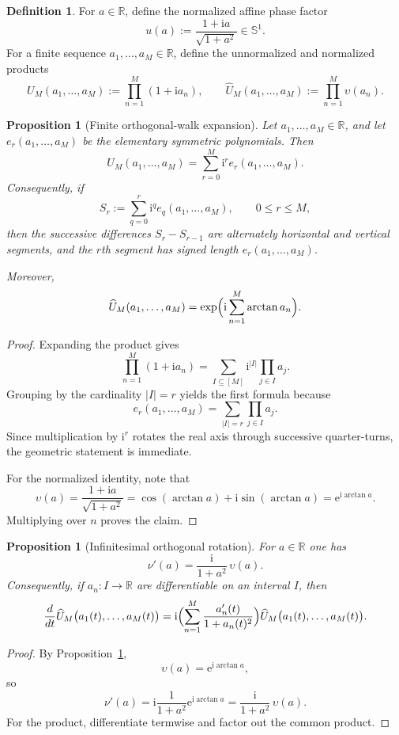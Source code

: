 \documentclass[11pt,a4paper]{article}
\numberwithin{equation}{section}
\newtheorem{proposition}[theorem]{Proposition}
\theoremstyle{definition}
\newtheorem{definition}[theorem]{Definition}
\theoremstyle{remark}
\newcommand{\RR}{\mathbb R}
\newcommand{\Sph}{\mathbb S^1}
\newcommand{\e}{\mathrm e}
\newcommand{\ii}{\mathrm i}
\begin{document}
\begin{definition}
For $a\in\RR$, define the normalized affine phase factor
\[
u(a):=\frac{1+\ii a}{\sqrt{1+a^2}}\in\Sph.
\]
For a finite sequence $a_1,\dots,a_M\in\RR$, define the unnormalized and normalized products
\[
U_M(a_1,\dots,a_M):=\prod_{n=1}^M (1+\ii a_n),
\qquad
\widehat U_M(a_1,\dots,a_M):=\prod_{n=1}^M \upsilon(a_n).
\]
\end{definition}

\begin{proposition}[Finite orthogonal-walk expansion]\label{P4:prop:finite-orthogonal}
Let $a_1,\dots,a_M\in\RR$, and let $e_r(a_1,\dots,a_M)$ be the elementary symmetric polynomials.  Then
\[
U_M(a_1,\dots,a_M)=\sum_{r=0}^M \ii^r e_r(a_1,\dots,a_M).
\]
Consequently, if
\[
S_r:=\sum_{q=0}^r \ii^q e_q(a_1,\dots,a_M),
\qquad 0\le r\le M,
\]
then the successive differences $S_r-S_{r-1}$ are alternately horizontal and vertical segments, and the $r$th segment has signed length $e_r(a_1,\dots,a_M)$.

Moreover,
\[
\widehat U_M(a_1,\dots,a_M)=\exp\Bigl(\ii\sum_{n=1}^M \arctan a_n\Bigr).
\]
\end{proposition}

\begin{proof}
Expanding the product gives
\[
\prod_{n=1}^M (1+\ii a_n)=\sum_{I\subseteq [M]} \ii^{|I|}\prod_{j\in I} a_j.
\]
Grouping by the cardinality $|I|=r$ yields the first formula because
\[
e_r(a_1,\dots,a_M)=\sum_{|I|=r}\prod_{j\in I}a_j.
\]
Since multiplication by $\ii^r$ rotates the real axis through successive quarter-turns, the geometric statement is immediate.

For the normalized identity, note that
\[
\upsilon(a)=\frac{1+\ii a}{\sqrt{1+a^2}}=
\cos(\arctan a)+\ii\sin(\arctan a)=\e^{\ii\arctan a}.
\]
Multiplying over $n$ proves the claim.
\end{proof}

\begin{proposition}[Infinitesimal orthogonal rotation]\label{P4:prop:derivative-nu}
For $a\in\RR$ one has
\[
\nu'(a)=\frac{\ii}{1+a^2}\,\upsilon(a).
\]
Consequently, if $a_n:I\to\RR$ are differentiable on an interval $I$, then
\[
\frac{d}{dt}\widehat U_M\bigl(a_1(t),\dots,a_M(t)\bigr)
=\ii\Bigl(\sum_{n=1}^M \frac{a_n'(t)}{1+a_n(t)^2}\Bigr)
\widehat U_M\bigl(a_1(t),\dots,a_M(t)\bigr).
\]
\end{proposition}

\begin{proof}
By Proposition~\ref{P4:prop:finite-orthogonal},
\[
\upsilon(a)=\e^{\ii\arctan a},
\]
so
\[
\nu'(a)=\ii\frac{1}{1+a^2}\e^{\ii\arctan a}=\frac{\ii}{1+a^2}\,\upsilon(a).
\]
For the product, differentiate termwise and factor out the common product.
\end{proof}
\end{document}
